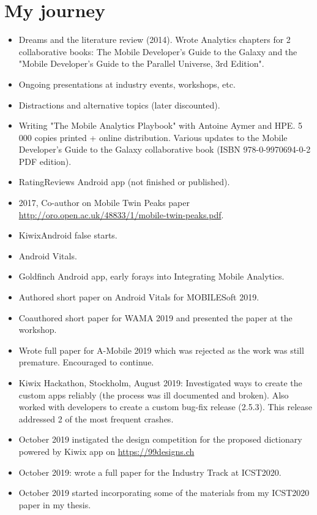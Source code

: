 \section{My journey}
\begin{itemize}
    \item Dreams and the literature review (2014). Wrote Analytics chapters for 2 collaborative books: The Mobile Developer's Guide to the Galaxy and the "Mobile Developer's Guide to the Parallel Universe, 3rd Edition".
    \item Ongoing presentations at industry events, workshops, etc.
    \item Distractions and alternative topics (later discounted).
    \item Writing "The Mobile Analytics Playbook" with Antoine Aymer and HPE. 5 000 copies printed + online distribution. Various updates to the Mobile Developer's Guide to the Galaxy collaborative book (ISBN 978-0-9970694-0-2 PDF edition).
    \item RatingReviews Android app (not finished or published).
    \item 2017, Co-author on Mobile Twin Peaks paper \url{http://oro.open.ac.uk/48833/1/mobile-twin-peaks.pdf}.
    \item KiwixAndroid false starts.
    \item Android Vitals.
    \item Goldfinch Android app, early forays into Integrating Mobile Analytics.
    \item Authored short paper on Android Vitals for MOBILESoft 2019.
    \item Coauthored short paper for WAMA 2019 and presented the paper at the workshop.
    \item Wrote full paper for A-Mobile 2019 which was rejected as the work was still premature. Encouraged to continue. 
    \item Kiwix Hackathon, Stockholm, August 2019: Investigated ways to create the custom apps reliably (the process was ill documented and broken). Also worked with developers to create a custom bug-fix release (2.5.3). This release addressed 2 of the most frequent crashes.
    \item October 2019 instigated the design competition for the proposed dictionary powered by Kiwix app on \url{https://99designs.ch}
    \item October 2019: wrote a full paper for the Industry Track at ICST2020.
    \item {} October 2019 started incorporating some of the materials from my ICST2020 paper in my thesis.

\end{itemize}
